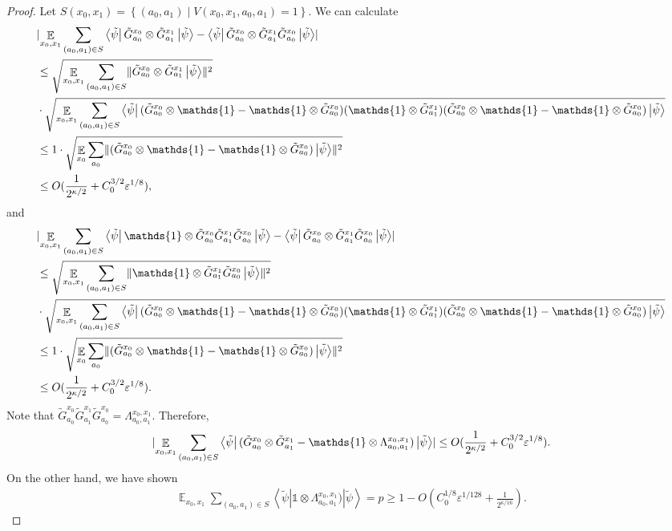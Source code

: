\documentclass[11pt]{article}
\theoremstyle{plain}
\theoremstyle{definition}
\newcommand {\set} [1] {\ensuremath{ \left\lbrace #1 \right\rbrace }}
\DeclarePairedDelimiter{\norm}{\lVert}{\rVert}
\DeclarePairedDelimiter{\abs}{\lvert}{\rvert}
\newcommand {\bra} [1] {\ensuremath{ \left\langle #1 \right| }}
\newcommand {\ket} [1] {\ensuremath{ \left| #1 \right\rangle }}
\DeclareMathOperator*{\bigE}{\mathbb{E}}
\newcommand {\id} {\ensuremath{\mathds{1}}}
\newcommand{\ep} {\ensuremath{\varepsilon}}
\newcommand{\x}{\otimes}
\newcommand{\1}{\mathbb{1}} %
\newcommand{\tG}{\tilde{G}}
\newcommand{\tpsi}{\tilde{\psi}}
\begin{document}
\begin{proof}
Let $S(x_0,x_1) = \set{(a_0, a_1) \mid V(x_0, x_1,a_0,a_1) =1}$.
We can calculate
\begin{align*}
	&\abs{\bigE_{x_0,x_1} \sum_{(a_0, a_1) \in S} \bra{\tpsi} \tG^{x_0}_{a_0} \x \tG^{x_1}_{a_1} \ket{\tpsi}
	- \bra{\tpsi} \tG^{x_0}_{a_0}  \x \tG^{x_1}_{a_1}\tG^{x_0}_{a_0} \ket{\tpsi}} \\
	&\leq \sqrt{ \bigE_{x_0,x_1} \sum_{(a_0, a_1) \in S} \norm{ \tG^{x_0}_{a_0} \x \tG^{x_1}_{a_1} \ket{\tpsi} }^2} \\
	&\cdot \sqrt{  \bigE_{x_0,x_1} \sum_{(a_0, a_1) \in S} \bra{\tpsi} (\tG^{x_0}_{a_0} \x \id - \id \x \tG^{x_0}_{a_0}) 
	(\id \x \tG^{x_1}_{a_1} )  (\tG^{x_0}_{a_0} \x \id - \id \x \tG^{x_0}_{a_0}) \ket{\tpsi}} \\
	&\leq 1 \cdot \sqrt{  \bigE_{x_0} \sum_{a_0} \norm{  (\tG^{x_0}_{a_0} \x \id - \id \x \tG^{x_0}_{a_0}) \ket{\tpsi}}^2} \\
	&\leq O(\frac{1}{2^{\kappa/2}} + C_0^{3/2}\ep^{1/8}),
\end{align*}
and
\begin{align*}
	&\abs{\bigE_{x_0,x_1} \sum_{(a_0, a_1) \in S} \bra{\tpsi} \id \x \tG^{x_0}_{a_0} \tG^{x_1}_{a_1}\tG^{x_0}_{a_0}  \ket{\tpsi}
	- \bra{\tpsi} \tG^{x_0}_{a_0}  \x \tG^{x_1}_{a_1}\tG^{x_0}_{a_0} \ket{\tpsi}} \\
	&\leq \sqrt{ \bigE_{x_0,x_1} \sum_{(a_0, a_1) \in S} \norm{ \id \x \tG^{x_1}_{a_1}\tG^{x_0}_{a_0}  \ket{\tpsi} }^2} \\
	&\cdot \sqrt{  \bigE_{x_0,x_1} \sum_{(a_0, a_1) \in S} \bra{\tpsi} (\tG^{x_0}_{a_0} \x \id - \id \x \tG^{x_0}_{a_0}) 
	(\id \x \tG^{x_1}_{a_1} )  (\tG^{x_0}_{a_0} \x \id - \id \x \tG^{x_0}_{a_0}) \ket{\tpsi}} \\
	&\leq 1 \cdot \sqrt{  \bigE_{x_0} \sum_{a_0} \norm{  (\tG^{x_0}_{a_0} \x \id - \id \x \tG^{x_0}_{a_0}) \ket{\tpsi}}^2} \\
	&\leq O(\frac{1}{2^{\kappa/2}} + C_0^{3/2}\ep^{1/8}).
\end{align*}
Note that $\tG^{x_0}_{a_0} \tG^{x_1}_{a_1}\tG^{x_0}_{a_0} = \Lambda^{x_0,x_1}_{a_0,a_1}$.
Therefore, 
\begin{align*}
	\abs{\bigE_{x_0,x_1} \sum_{(a_0, a_1) \in S} \bra{\tpsi} (\tG^{x_0}_{a_0} \x \tG^{x_1}_{a_1} - \id \x \Lambda^{x_0,x_1}_{a_0,a_1}) \ket{\tpsi}}
	\leq O(\frac{1}{2^{\kappa/2}} + C_0^{3/2}\ep^{1/8}).
\end{align*}
On the other hand, we have shown
\begin{align*}
	\bigE_{x_0,x_1} \sum_{(a_0, a_1) \in S} \bra{\tpsi} \id \x \Lambda^{x_0,x_1}_{a_0,a_1}) \ket{\tpsi} = p \geq 1- O(C_0^{1/8}\ep^{1/128} + \frac{1}{2^{\kappa/16}}).

\end{align*}
\end{proof}
\end{document}
